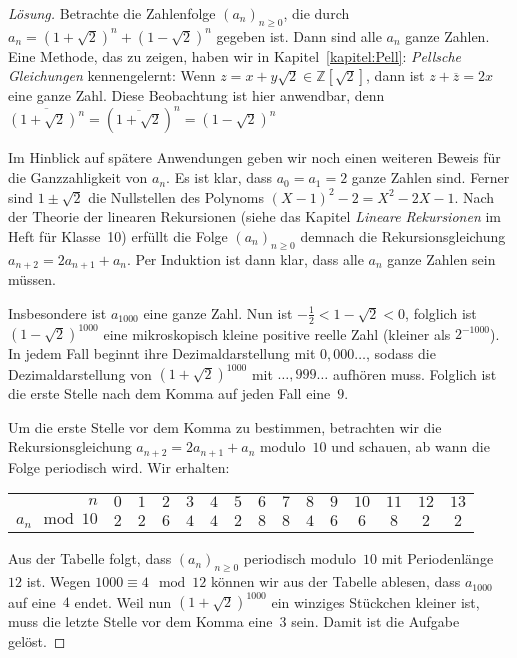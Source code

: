 \begin{proof}[Lösung]
	 Betrachte die Zahlenfolge $(a_n)_{n\geqslant 0}$, die durch $a_n = (1+\sqrt{2})^n + (1-\sqrt{2})^n$ gegeben ist. Dann sind alle $a_n$ ganze Zahlen. Eine Methode, das zu zeigen, haben wir in Kapitel~\ref{kapitel:Pell}: \emph{Pellsche Gleichungen} kennengelernt: Wenn $z=x+y\sqrt{2}\in\mathbb Z[\sqrt{2}]$, dann ist $z+\overline{z}=2x$ eine ganze Zahl. Diese Beobachtung ist hier anwendbar, denn $\overline{(1+\sqrt{2})^n}=(\overline{1+\sqrt{2}})^n=(1-\sqrt{2})^n$
	
	Im Hinblick auf spätere Anwendungen geben wir noch einen weiteren Beweis für die Ganzzahligkeit von $a_n$. Es ist klar, dass $a_0 = a_1 = 2$ ganze Zahlen sind. Ferner sind $1\pm\sqrt{2}$ die Nullstellen des Polynoms $(X-1)^2-2=X^2-2X-1$. Nach der Theorie der linearen Rekursionen (siehe das Kapitel \emph{Lineare Rekursionen} im Heft für Klasse~10) erfüllt die Folge $(a_n)_{n\geqslant 0}$ demnach die Rekursionsgleichung $a_{n+2} = 2a_{n+1} + a_n$. Per Induktion ist dann klar, dass alle $a_n$ ganze Zahlen sein müssen.
	
	Insbesondere ist $a_{1000}$ eine ganze Zahl. Nun ist $-\frac12<1-\sqrt{2}<0$, folglich ist $(1-\sqrt{2})^{1000}$ eine mikroskopisch kleine positive reelle Zahl (kleiner als $2^{-1000}$). In jedem Fall beginnt ihre Dezimaldarstellung mit $0{,}000\dotso$, sodass die Dezimaldarstellung von $(1+\sqrt{2})^{1000}$ mit $\ldots{,}999\dotso$ aufhören muss. Folglich ist die erste Stelle nach dem Komma auf jeden Fall eine~$9$. 
	
	Um die erste Stelle vor dem Komma zu bestimmen, betrachten wir die Rekursionsgleichung $a_{n+2} = 2a_{n+1} + a_n$ modulo~$10$ und schauen, ab wann die Folge periodisch wird. Wir erhalten:
	\begin{center}
		\begin{tabular}{r | c c c c c c c c c c c c c c }\toprule
			$n$ & $0$ & $1$ & $2$ & $3$ & $4$ & $5$ & $6$ & $7$ & $8$ & $9$ & $10$ & $11$ & $12$ & $13$ \\
			$a_n \mod 10$ & $2$ & $2$ & $6$ & $4$ & $4$ & $2$ & $8$ & $8$ & $4$ & $6$ & $6$ & $8$ & $2$ & $2$ \\\bottomrule
		\end{tabular}
	\end{center}
	Aus der Tabelle folgt, dass $(a_n)_{n\geqslant 0}$ periodisch modulo~$10$ mit Periodenlänge~$12$ ist. Wegen $1000\equiv 4\mod 12$ können wir aus der Tabelle ablesen, dass $a_{1000}$ auf eine~$4$ endet. Weil nun $(1+\sqrt{2})^{1000}$ ein winziges Stückchen kleiner ist, muss die letzte Stelle vor dem Komma eine~$3$ sein. Damit ist die Aufgabe gelöst.
\end{proof}

